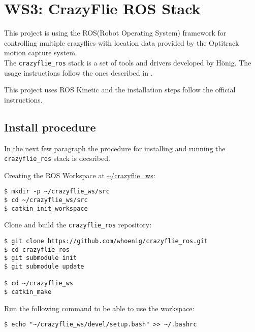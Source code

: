 \section{WS3: CrazyFlie ROS Stack}
\label{section:ws3}
This project is using the ROS(Robot Operating System) framework for controlling multiple crazyflies with location data provided by the Optitrack motion capture system.\\
\noindent The \texttt{crazyflie\_ros} stack is a set of tools and drivers developed by Hönig\cite{HoenigMixedReality2015}. The usage instructions follow the ones described in \cite{book_ros}.

This project uses ROS Kinetic and the installation steps follow the official instructions\cite{web_ros_wiki_install}.

\subsection{Install procedure}
In the next few paragraph the procedure for installing and running the \texttt{crazyflie\_ros} stack is decsribed.

\noindent Creating the ROS Workspace at \url{~/crazyflie_ws}:
\begin{mdframed}[backgroundcolor=light-gray, linecolor=light-gray]
\begin{verbatim}
$ mkdir -p ~/crazyflie_ws/src
$ cd ~/crazyflie_ws/src
$ catkin_init_workspace    
\end{verbatim}
\end{mdframed}

\noindent Clone and build the \texttt{crazyflie\_ros} repository:

\begin{mdframed}[backgroundcolor=light-gray, linecolor=light-gray]
\begin{verbatim}
$ git clone https://github.com/whoenig/crazyflie_ros.git
$ cd crazyflie_ros
$ git submodule init
$ git submodule update

$ cd ~/crazyflie_ws
$ catkin_make
\end{verbatim}
\end{mdframed}

\noindent Run the following command to be able to use the workspace:
\begin{mdframed}[backgroundcolor=light-gray, linecolor=light-gray]
\begin{verbatim}
$ echo "~/crazyflie_ws/devel/setup.bash" >> ~/.bashrc
\end{verbatim}
\end{mdframed}

